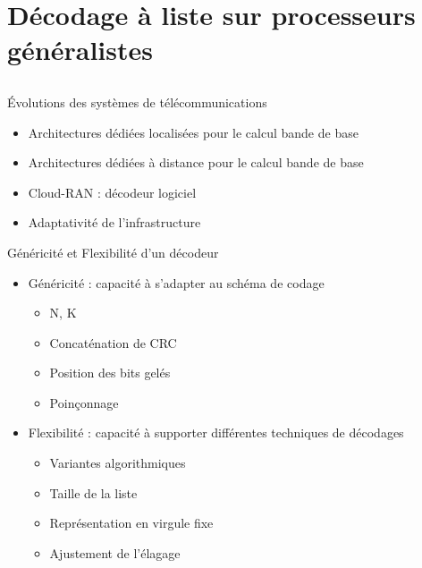 \section[Décodeur logiciel à liste]{Décodage à liste sur processeurs généralistes}
\subsection*{}

\begin{frame}[c]{\'Evolutions des systèmes de télécommunications}
	\begin{itemize}
		\item Architectures dédiées localisées pour le calcul bande de base
		\item Architectures dédiées à distance pour le calcul bande de base
		\item Cloud-RAN : décodeur logiciel
		\item Adaptativité de l'infrastructure
	\end{itemize}
\end{frame}


\begin{frame}[c]{Généricité et Flexibilité d'un décodeur}
  \vfill
	\begin{itemize}
		\item Généricité : capacité à s'adapter au schéma de codage
		\begin{itemize}
			\item N, K
			\item Concaténation de CRC
			\item Position des bits gelés
			\item Poinçonnage
		\end{itemize}
    \vfill
		\item Flexibilité : capacité à supporter différentes techniques de décodages
		\begin{itemize}
			\item Variantes algorithmiques
			\item Taille de la liste
			\item Représentation en virgule fixe
			\item Ajustement de l'élagage
		\end{itemize}
	\end{itemize}
  \vfill
\end{frame}


